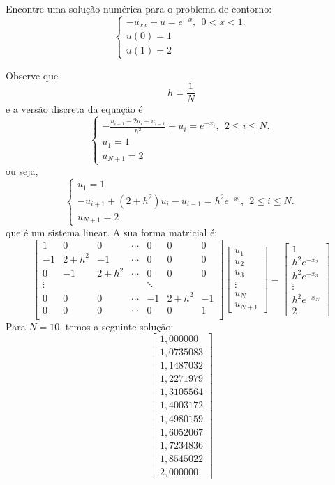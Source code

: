 \begin{ex}Encontre uma solução numérica para o problema de contorno:
$$\left\{\begin{array}{l}-u_{xx}+u=e^{-x},~~ 0<x<1.\\
u(0)=1\\
u(1)=2\end{array}
\right.
$$
\end{ex}
\begin{sol}
Observe que
$$
h=\frac{1}{N}
$$
e a versão discreta da equação é
$$\left\{\begin{array}{l}-\frac{u_{i+1}-2u_i+u_{i-1}}{h^2}+u_i=e^{-x_i},~~ 2\leq i\leq N.\\
u_1=1\\
u_{N+1}=2\end{array}
\right.
$$
ou seja,
$$\left\{\begin{array}{l}u_1=1\\-u_{i+1}+(2+h^2)u_i-u_{i-1}=h^2e^{-x_i},~~ 2\leq i\leq N.\\
u_{N+1}=2\end{array}
\right.
$$
que é um sistema linear. A sua forma matricial é:
$$
\left[\begin{array}{ccccccc}
1&0&0&\cdots&0&0&0\\
-1&2+h^2&-1&\cdots&0&0&0\\
0&-1&2+h^2&\cdots&0&0&0\\
\vdots&&&&\ddots&&\\
0&0&0&\cdots&-1&2+h^2&-1\\
0&0&0&\cdots&0&0&1\\
\end{array}\right]
\left[\begin{array}{c}u_1\\u_2\\u_3\\ \vdots\\ u_{N}\\u_{N+1}\end{array}\right]=
\left[\begin{array}{c}1\\h^2e^{-x_2}\\h^2e^{-x_3}\\ \vdots\\ h^2e^{-x_N}\\2\end{array}\right]
$$
Para $N=10$, temos a seguinte solução:
$$
\left[\begin{array}{c} 1,000000\\  1,0735083  \\1,1487032 \\ 1,2271979\\  1,3105564\\  1,4003172\\  1,4980159\\  1,6052067\\  1,7234836\\  1,8545022\\2,000000\end{array}\right]
$$  
\end{sol}

